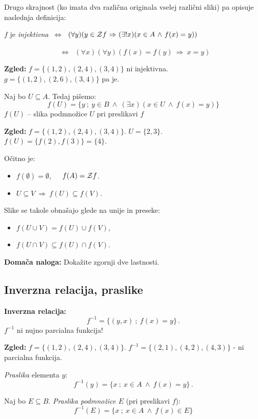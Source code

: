 \documentclass[11pt,paper=b5,DIV=13,headinclude,footinclude]{scrbook}
\def\inn {{~\wedge~}}
\def\sledi {{~\Rightarrow~}}
\def\cee {{~\Leftrightarrow~}}
\begin{document}
Drugo skrajnost (ko imata dva različna originala vselej različni sliki) pa opisuje
naslednja definicija:

$f$ je {\em injektivna} $\cee$ $(\forall y)(y\in {\cal Z}f\sledi (\exists!x)(x\in A \inn f(x) = y))$

~~~~~~~~~~~~~~~$\cee$ $(\forall x)(\forall y)(f(x) = f(y) \sledi x = y)$

\bigskip
\textbf{ Zgled:} $f = \{(1,2),(2,4),(3,4)\}$ ni injektivna.
$g = \{(1,2),(2,6),(3,4)\}$ pa je.

\bigskip
Naj bo $U\subseteq A$. Tedaj pišemo:
$$f(U) = \{y~;~y\in B\inn (\exists x)(x\in U\inn f(x) = y)\}$$
$f(U)$ -- slika podmnožice $U$ pri preslikavi $f$

\bigskip
\textbf{ Zgled:} $f = \{(1,2),(2,4),(3,4)\}$.
$U = \{2,3\}$. $f(U) = \{f(2),f(3)\} = \{4\}$.

\medskip
Očitno je:
\begin{itemize}
  \item $f(\emptyset) = \emptyset$,~~~$f(A) = {\cal Z}f$.
  \item $U\subseteq V\sledi f(U)\subseteq f(V)$.
\end{itemize}

Slike se takole obnašajo glede na unije in preseke:
\begin{itemize}
  \item $f(U\cup V) = f(U)\cup f(V)$,
  \item $f(U\cap V) \subseteq f(U)\cap f(V)$.
\end{itemize}

\textbf{ Domača naloga:} Dokažite zgornji dve lastnosti.


\subsection{Inverzna relacija, praslike}

\bigskip
\textbf{ Inverzna relacija:}
$$f^{-1} = \{(y,x)~;~f(x) = y\}\,.$$
$f^{-1}$ ni nujno parcialna funkcija!

\medskip
\textbf{ Zgled:} $f = \{(1,2),(2,4),(3,4)\}$.
$f^{-1} = \{(2,1),(4,2),(4,3)\}$ - ni parcialna funkcija.

\medskip
{\em Praslika} elementa $y$:
$$f^{-1}(y) = \{x~;~x\in A\inn f(x) = y\}\,.$$

Naj bo $E\subseteq B$. {\em Praslika podmnožice $E$} (pri preslikavi $f$):
$$f^{-1}(E) = \{x~;~x\in A\inn f(x) \in E\}$$
\end{document}
